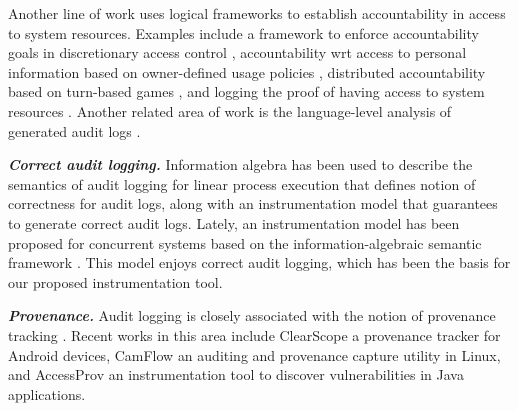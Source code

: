 Another line of work uses logical frameworks to establish accountability in access to system resources. Examples include a framework to enforce accountability goals in discretionary access control \cite{auditbased_compliance}, accountability wrt access to personal information based on owner-defined usage policies \cite{logic_audit}, distributed accountability based on turn-based games \cite{theorey_accountability}, and logging the proof of having access to system resources \cite{AURA, apple}. %
Another related area of work is the language-level analysis of generated audit logs \cite{bavera2015justification,ricciotti2017strongly%
}. 

\textit{\textbf{Correct audit logging.}}
Information algebra \cite{Kohlas14} has been used to describe the semantics of audit logging \cite{amir-chong-skalka-post16} for linear process execution that defines notion of correctness for audit logs, along with an instrumentation model that guarantees to generate correct audit logs. %
Lately, an instrumentation model has been proposed for concurrent systems based on the information-algebraic semantic framework \cite{lsfa20}. This model enjoys correct audit logging, which has been the basis for our proposed instrumentation tool. %



\textit{\textbf{Provenance.}}
Audit logging is closely associated with the notion of provenance tracking \cite{ricciotti2017core, herschel2017survey, buneman2019data}. Recent works in this area include ClearScope \cite{gordon2019precise} a provenance tracker for Android devices, CamFlow \cite{pasquier2017practical} an auditing and provenance capture utility in Linux, and AccessProv \cite{capobianco2017accessprov} an instrumentation tool to discover vulnerabilities in Java applications.
